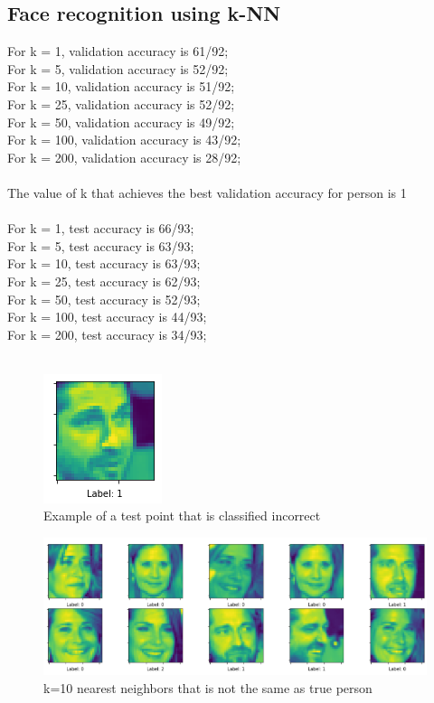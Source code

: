 \documentclass{article}
\begin{document}
\subsection{Face recognition using k-NN}
For k = 1, validation accuracy is 61/92;\\
For k = 5, validation accuracy is 52/92;\\
For k = 10, validation accuracy is 51/92;\\
For k = 25, validation accuracy is 52/92;\\
For k = 50, validation accuracy is 49/92;\\
For k = 100, validation accuracy is 43/92;\\
For k = 200, validation accuracy is 28/92;\\\\
The value of k that achieves the best validation accuracy for person is 1 \\\\
For k = 1, test accuracy is 66/93;\\
For k = 5, test accuracy is 63/93;\\
For k = 10, test accuracy is 63/93;\\
For k = 25, test accuracy is 62/93;\\
For k = 50, test accuracy is 52/93;\\
For k = 100, test accuracy is 44/93;\\
For k = 200, test accuracy is 34/93;\\\\

\begin{figure}
    \caption{Example of a test point that is classified incorrect}
    \centering
        \includegraphics[scale=0.6]{5.png}
\end{figure}

\begin{figure}
    \caption{k=10 nearest neighbors that is not the same as true person}
    \centering
        \includegraphics[scale=0.6]{6.png}
\end{figure}
\end{document}
